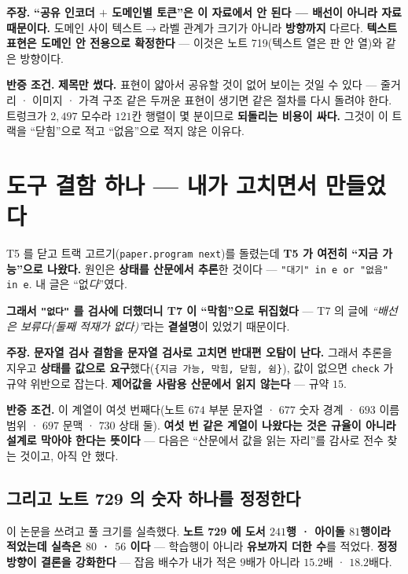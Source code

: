 \documentclass[10pt,a4paper]{article}
\newcommand{\claim}[2]{\begin{claimbox}\textbf{주장.} #1\par\smallskip
  \textcolor{gray!70}{\textbf{반증 조건.} #2}\end{claimbox}}
\begin{document}
\claim{\textbf{``공유 인코더 $+$ 도메인별 토큰''은 이 자료에서 안 된다 --- 배선이
아니라 자료 때문이다.} 도메인 사이 텍스트$\to$라벨 관계가 크기가 아니라
\textbf{방향까지} 다르다. \textbf{텍스트 표현은 도메인 안 전용으로 확정한다} ---
이것은 노트 719(텍스트 열은 판 안 열)와 같은 방향이다.}
{\textbf{제목만 썼다.} 표현이 얇아서 공유할 것이 없어 보이는 것일 수 있다 --- 줄거리
· 이미지 · 가격 구조 같은 두꺼운 표현이 생기면 같은 절차를 다시 돌려야 한다. 트렁크가
$2{,}497$ 모수라 $121$칸 행렬이 몇 분이므로 \textbf{되돌리는 비용이 싸다.} 그것이 이
트랙을 ``닫힘''으로 적고 ``없음''으로 적지 않은 이유다.}

\section{도구 결함 하나 --- 내가 고치면서 만들었다}

T5 를 닫고 트랙 고르기(\texttt{paper.program next})를 돌렸는데 \textbf{T5 가 여전히
``지금 가능''으로 나왔다.} 원인은 \textbf{상태를 산문에서 추론}한 것이다 ---
\texttt{"대기" in e or "없음" in e}. 내 글은 ``없\emph{다}''였다.

\textbf{그래서 \texttt{"없다"} 를 검사에 더했더니 T7 이 ``막힘''으로 뒤집혔다} ---
T7 의 글에 \emph{``배선은 보류다(둘째 적재가 없다)''}라는 \textbf{곁설명}이 있었기
때문이다.

\claim{\textbf{문자열 검사 결함을 문자열 검사로 고치면 반대편 오탐이 난다.} 그래서
추론을 지우고 \textbf{상태를 값으로 요구}했다(\texttt{\{지금 가능, 막힘, 닫힘,
쉼\}}), 값이 없으면 \texttt{check} 가 규약 위반으로 잡는다. \textbf{제어값을 사람용
산문에서 읽지 않는다} --- 규약 $15$.}
{이 계열이 여섯 번째다(노트 $674$ 부분 문자열 · $677$ 숫자 경계 · $693$ 이름 범위 ·
$697$ 문맥 · $730$ 상태 둘). \textbf{여섯 번 같은 계열이 나왔다는 것은 규율이 아니라
설계로 막아야 한다는 뜻이다} --- 다음은 ``산문에서 값을 읽는 자리''를 감사로 전수
찾는 것이고, 아직 안 했다.}

\subsection*{그리고 노트 729 의 숫자 하나를 정정한다}

이 논문을 쓰려고 풀 크기를 실측했다. \textbf{노트 729 에 도서 $241$행 · 아이돌
$81$행이라 적었는데 실측은 $80$ · $56$ 이다} --- 학습행이 아니라 \textbf{유보까지
더한 수}를 적었다. \textbf{정정 방향이 결론을 강화한다} --- 잡음 배수가 내가 적은
$9$배가 아니라 $\mathbf{15.2}$배 · $\mathbf{18.2}$배다.
\end{document}

